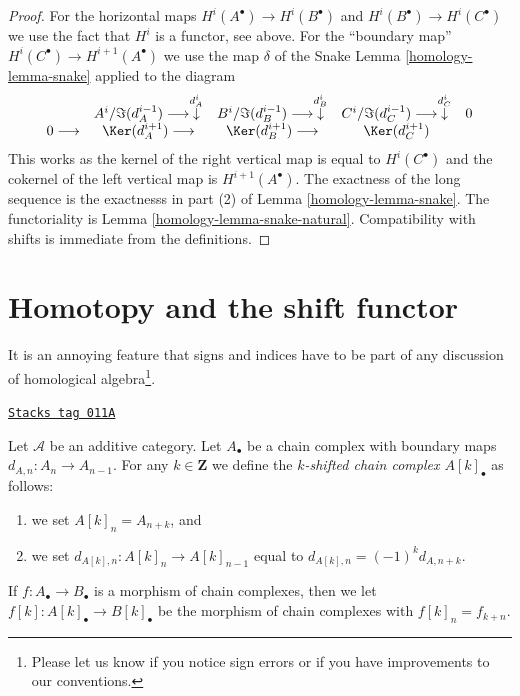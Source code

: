 \begin{proof}

For the horizontal maps $H^i(A^\bullet) \to H^i(B^\bullet)$ and
$H^i(B^\bullet) \to H^i(C^\bullet)$ we use the fact that $H^i$
is a functor, see above. For the ``boundary map''
$H^i(C^\bullet) \to H^{i + 1}(A^\bullet)$ we use the map $\delta$
of the Snake Lemma \ref{homology-lemma-snake}
applied to the diagram
$$
\begin{array}{ccccc} & A^i/\Im(d_A^{i - 1}) \longrightarrow\overset{d_A^i}{\downarrow} & B^i/\Im(d_B^{i - 1}) \longrightarrow\overset{d_B^i}{\downarrow} & C^i/\Im(d_C^{i - 1}) \longrightarrow\overset{d_C^i}{\downarrow} & 0 \\ 0 \longrightarrow & \Ker(d_A^{i + 1}) \longrightarrow & \Ker(d_B^{i + 1}) \longrightarrow & \Ker(d_C^{i + 1}) & \end{array}
$$
This works as the kernel of the right vertical map is equal to
$H^i(C^\bullet)$ and the cokernel of the left vertical map is
$H^{i + 1}(A^\bullet)$. The exactness of the long sequence is
the exactnesss in part (2) of Lemma \ref{homology-lemma-snake}.
The functoriality is Lemma \ref{homology-lemma-snake-natural}. Compatibility
with shifts is immediate from the definitions.
\end{proof}

\section{Homotopy and the shift functor}
\label{homology-section-homotopy-shift}
It is an annoying feature that signs and indices
have to be part of any discussion of homological
algebra\footnote{Please let us know if you notice sign errors or
if you have improvements to our conventions.}.

\begin{definition}[Shift]
\label{homology-definition-shift}
\href{https://stacks.math.columbia.edu/tag/011A}{\texttt{Stacks tag 011A}}

Let $\mathcal{A}$ be an additive category.
Let $A_\bullet$ be a chain complex
with boundary maps $d_{A, n} : A_n \to A_{n - 1}$.
For any $k \in \mathbf{Z}$ we define the
{\it $k$-shifted chain complex $A[k]_\bullet$}
as follows:
\begin{enumerate}
\item we set $A[k]_n = A_{n + k}$, and
\item we set $d_{A[k], n} : A[k]_n \to A[k]_{n - 1}$
equal to $d_{A[k], n} = (-1)^k d_{A, n + k}$.
\end{enumerate}
If $f : A_\bullet \to B_\bullet$ is a morphism of
chain complexes, then we let
$f[k] : A[k]_\bullet \to B[k]_\bullet$ be the
morphism of chain complexes with
$f[k]_n = f_{k + n}$.
\end{definition}

